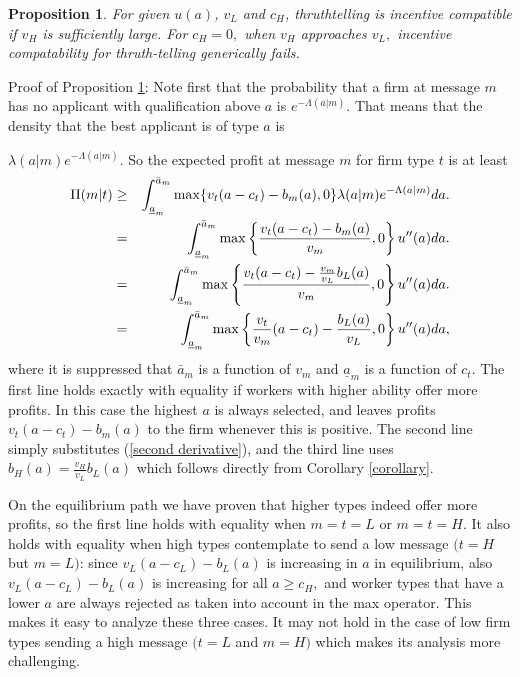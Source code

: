 \documentclass[12pt]{article}
\theoremstyle{plain}
\newtheorem{prop}{Proposition}
\begin{document}
\begin{prop}
\label{prop: incentive-combat} For given $u(a)$, $v_{L}$ and $c_{H}$,
thruthtelling is incentive compatible if $v_{H}$ is sufficiently large. For $%
c_{H}=0,$ when $v_{H}$ approaches $v_{L},$ incentive compatability for
thruth-telling generically fails.
\end{prop}

\noindent Proof of Proposition \ref{prop: incentive-combat}: Note first that the probability
that a firm at message $m$ has no applicant with qualification above $a$ is $%
e^{-\Lambda (a|m)}.$ That means that the density that the best applicant is
of type $a$ is

$\lambda (a|m)e^{-\Lambda (a|m)}$. So the expected profit at message $m$ for
firm type $t$ is at least%
\begin{eqnarray}
\Pi (m|t) &\geq &\int_{\underline{a}_{m}}^{\bar{a}_{m}}\max
\{v_{t}(a-c_{t})-b_{m}(a),0\}\lambda (a|m)e^{-\Lambda (a|m)}da.  \notag \\
&=&\int_{\underline{a}_{m}}^{\bar{a}_{m}}\max \left\{ \frac{%
v_{t}(a-c_{t})-b_{m}(a)}{v_{m}},0\right\} u^{\prime \prime }(a)da.
\label{truth-start} \\
&=&\int_{\underline{a}_{m}}^{\bar{a}_{m}}\max \left\{ \frac{v_{t}(a-c_{t})-%
\frac{v_{m}}{v_{L}}b_{L}(a)}{v_{m}},0\right\} u^{\prime \prime }(a)da. 
\notag \\
&=&\int_{\underline{a}_{m}}^{\bar{a}_{m}}\max \left\{ \frac{v_{t}}{v_{m}}%
(a-c_{t})-\frac{b_{L}(a)}{v_{L}},0\right\} u^{\prime \prime }(a)da,  \notag
\end{eqnarray}%
where it is suppressed that $\bar{a}_{m}$ is a function of $v_{m}$ and $%
\underline{a}_{m}$ is a function of $c_{t}.$ The first line holds exactly
with equality if workers with higher ability offer more profits. In this
case the highest $a$ is always selected, and leaves profits $%
v_{t}(a-c_{t})-b_{m}(a)$ to the firm whenever this is positive. The second
line simply substitutes (\ref{second derivative}), and the third line uses $%
b_{H}(a)=\frac{v_{H}}{v_{L}}b_{L}(a)$ which follows directly from Corollary %
\ref{corollary}.

On the equilibrium path we have proven that higher types indeed offer more
profits, so the first line holds with equality when $m=t=L$ or $m=t=H.$ It
also holds with equality when high types contemplate to send a low message $%
(t=H$ but $m=L)$: since $v_{L}(a-c_{L})-b_{L}(a)$ is increasing in $a$ in
equilibrium, also $v_{L}(a-c_{L})-b_{L}(a)$ is increasing for all $a\geq
c_{H},$ and worker types that have a lower $a$ are always rejected as taken
into account in the max operator. This makes it easy to analyze these three
cases. It may not hold in the case of low firm types sending a high message $%
(t=L$ and $m=H)$ which makes its analysis more challenging.
\end{document}
